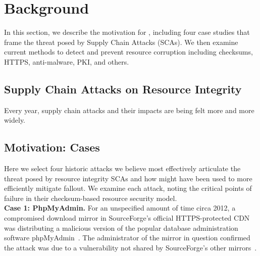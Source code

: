 \section{Background} \label{sec:background}

In this section, we describe the motivation for \SYSTEM{}, including four case
studies that frame the threat posed by Supply Chain Attacks (SCAs). We then
examine current methods to detect and prevent resource corruption including
checksums, HTTPS, anti-malware, PKI, and others.

\subsection{Supply Chain Attacks on Resource Integrity}

Every year, supply chain attacks and their impacts are being felt more and more
widely. 

\subsection{Motivation: Cases}

Here we select four historic attacks we believe most effectively articulate the
threat posed by resource integrity SCAs and how \SYSTEM{} might have been used
to more efficiently mitigate fallout. We examine each attack, noting the
critical points of failure in their checksum-based resource security model. \\

\noindent\textbf{Case 1: PhpMyAdmin.} For an unspecified amount of time circa
2012, a compromised download mirror in SourceForge's official HTTPS-protected
CDN was distributing a malicious version of the popular database administration
software phpMyAdmin~\cite{SCA-PMA3}. The administrator of the mirror in question
confirmed the attack was due to a vulnerability not shared by SourceForge's
other mirrors~\cite{SCA-PMA2}.

